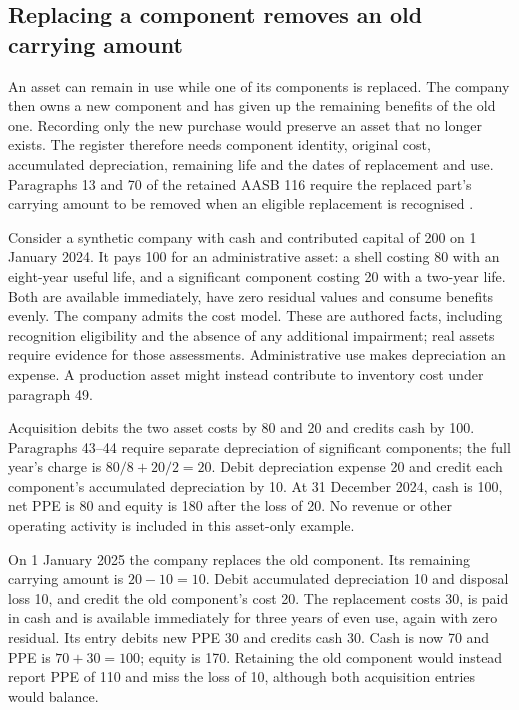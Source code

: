 \subsection{Replacing a component removes an old carrying amount}
\label{sec:ppe-replacement}

An asset can remain in use while one of its components is replaced. The company
then owns a new component and has given up the remaining benefits of the old
one. Recording only the new purchase would preserve an asset that no longer
exists. The register therefore needs component identity, original cost,
accumulated depreciation, remaining life and the dates of replacement and use.
Paragraphs 13 and 70 of the retained AASB 116 require the replaced part's
carrying amount to be removed when an eligible replacement is recognised
\citep{aasb116dated}.

Consider a synthetic company with cash and contributed capital of 200 on
1 January 2024. It pays 100 for an administrative asset: a shell costing 80
with an eight-year useful life, and a significant component costing 20 with a
two-year life. Both are available immediately, have zero residual values and
consume benefits evenly. The company admits the cost model. These are
authored facts, including recognition eligibility and the absence of any
additional impairment; real assets require evidence for those assessments.
Administrative use makes depreciation an expense. A production asset might
instead contribute to inventory cost under paragraph 49.

Acquisition debits the two asset costs by 80 and 20 and credits cash by 100.
Paragraphs 43--44 require separate depreciation of significant components;
the full year's charge is $80/8+20/2=20$. Debit depreciation expense 20 and
credit each component's accumulated depreciation by 10. At 31 December 2024,
cash is 100, net PPE is 80 and equity is 180 after the loss of 20. No revenue
or other operating activity is included in this asset-only example.

On 1 January 2025 the company replaces the old component. Its remaining
carrying amount is $20-10=10$. Debit accumulated depreciation 10 and disposal
loss 10, and credit the old component's cost 20. The replacement costs 30,
is paid in cash and is available immediately for three years of even use,
again with zero residual. Its entry debits new PPE 30 and credits cash 30.
Cash is now 70 and PPE is $70+30=100$; equity is 170. Retaining the old
component would instead report PPE of 110 and miss the loss of 10, although
both acquisition entries would balance.

